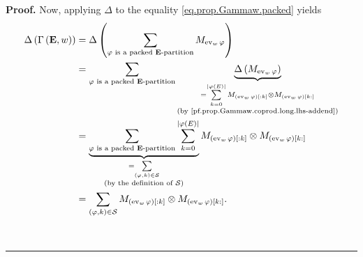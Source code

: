 \documentclass[numbers=enddot,12pt,final,onecolumn,notitlepage,abstracton]{scrartcl}
\theoremstyle{definition}
\newenvironment{proof}[1][Proof]{\noindent\textbf{#1.} }{\ \rule{0.5em}{0.5em}}
\let\sumnonlimits\sum
\renewcommand{\sum}{\sumnonlimits\limits}
\newenvironment{verlong}{}{}
\newcommand{\ev}{\operatorname{ev}}
\newcommand{\EE}{{\mathbf{E}}}
\begin{document}
\begin{verlong}
\begin{proof}
Now, applying $\Delta$ to the equality \eqref{eq.prop.Gammaw.packed} yields
\begin{align}
\Delta \left( \Gamma \left( \EE, w \right) \right)
&= \Delta \left( \sum_{\varphi \text{ is a packed } \EE\text{-partition}}
  M_{\ev_w \varphi} \right) \nonumber \\
&= \sum_{\varphi \text{ is a packed } \EE\text{-partition}}
  \underbrace{\Delta \left( M_{\ev_w \varphi} \right)}_{\substack{
    =\sum_{k=0}^{\left\vert \varphi\left(  E\right)  \right\vert }M_{\left(
    \operatorname{ev}_{w}\varphi\right)  \left[  :k\right]  }\otimes M_{\left(
    \operatorname{ev}_{w}\varphi\right)  \left[  k:\right]  }\\
    \text{(by \eqref{pf.prop.Gammaw.coprod.long.lhs-addend})}}}\nonumber\\
&  =\underbrace{\sum_{\varphi\text{ is a packed } \EE \text{-partition}%
}\sum_{k=0}^{\left\vert \varphi\left(  E\right)  \right\vert }}%
_{\substack{=\sum_{\left(  \varphi,k\right)  \in\mathcal{S}}\\\text{(by the
definition of }\mathcal{S}\text{)}}}M_{\left(  \operatorname{ev}_{w}%
\varphi\right)  \left[  :k\right]  }\otimes M_{\left(  \operatorname{ev}%
_{w}\varphi\right)  \left[  k:\right]  }\nonumber\\
&  =\sum_{\left(  \varphi,k\right)  \in\mathcal{S}}M_{\left(
\operatorname{ev}_{w}\varphi\right)  \left[  :k\right]  }\otimes M_{\left(
\operatorname{ev}_{w}\varphi\right)  \left[  k:\right]  }%
.\label{pf.Gammaw.coprod.long.lhs}%
\end{align}



\end{proof}
\end{verlong}
\end{document}

